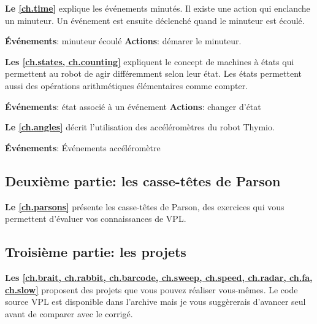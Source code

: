  \quad {} \hfill {}
\quad {} \quad {}

\medskip


\medskip

\textbf{Le \cref{ch.time}} explique les événements minutés.
Il existe une action qui enclanche un minuteur.
Un événement est ensuite déclenché quand le minuteur est écoulé.

\textbf{Événements}: minuteur écoulé\hfill
\textbf{Actions}: démarer le minuteur.

 \hfill {}

\newpage

\textbf{Les \cref{ch.states, ch.counting}} expliquent le concept de machines à états qui permettent au robot de agir différemment selon leur état.
Les états permettent aussi des opérations arithmétiques élémentaires comme compter.

\textbf{Événements}: état associé à un événement\hfill
\textbf{Actions}: changer d'état

 \hfill {}

\medskip

\textbf{Le \cref{ch.angles}} décrit l'utilisation des accéléromètres du robot Thymio.

\textbf{Événements}: Événements accéléromètre

 \quad {}

\bigskip

\subsection*{Deuxième partie: les casse-têtes de Parson}

\textbf{Le \cref{ch.parsons}} présente les casse-têtes de Parson, des exercices qui vous permettent d'évaluer vos connaissances de VPL.

\bigskip

\subsection*{Troisième partie: les projets}
\textbf{Les \cref{ch.brait, ch.rabbit, ch.barcode, ch.sweep, ch.speed, ch.radar, ch.fa, ch.slow}} proposent des projets que vous pouvez réaliser vous-mêmes.
Le code source VPL est disponible dans l'archive mais je vous suggèrerais d'avancer seul avant de comparer avec le corrigé.

